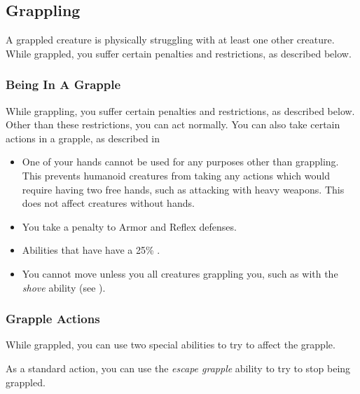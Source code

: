     \subsection{Grappling}\label{Grappling}
        A grappled creature is physically struggling with at least one other creature.
        While grappled, you suffer certain penalties and restrictions, as described below.

        \subsubsection{Being In A Grapple}
            While grappling, you suffer certain penalties and restrictions, as described below. Other than these restrictions, you can act normally. You can also take certain actions in a grapple, as described in 
            \begin{itemize}
                \item One of your hands cannot be used for any purposes other than grappling.
                    This prevents humanoid creatures from taking any actions which would require having two free hands, such as attacking with heavy weapons.
                    This does not affect creatures without hands.
                \item You take a  penalty to Armor and Reflex defenses.
                \item Abilities that have  have a 25\% .
                \item You cannot move unless you  all creatures grappling you, such as with the \textit{shove} ability (see ).
            \end{itemize}

        \subsubsection{Grapple Actions}\label{Grapple Actions}
            While grappled, you can use two special abilities to try to affect the grapple.

            \label{Escape Grapple} As a standard action, you can use the \textit{escape grapple} ability to try to stop being grappled.

